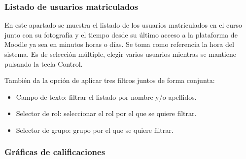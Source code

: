 \subsubsection{Listado de usuarios matriculados}

En este apartado se muestra el listado de los usuarios matriculados en el curso junto con su fotografía y el tiempo desde su último acceso a la plataforma de Moodle ya sea en minutos horas o días. Se toma como referencia la hora del sistema. Es de selección múltiple, elegir varios usuarios mientras se mantiene pulsando la tecla Control.

También da la opción de aplicar tres filtros juntos de forma conjunta:

\begin{itemize}
	\item Campo de texto: filtrar el listado por nombre y/o apellidos.
	\item Selector de rol: seleccionar el rol por el que se quiere filtrar.
	\item Selector de grupo: grupo por el que se quiere filtrar.
\end{itemize}

\subsubsection{Gráficas de calificaciones}

